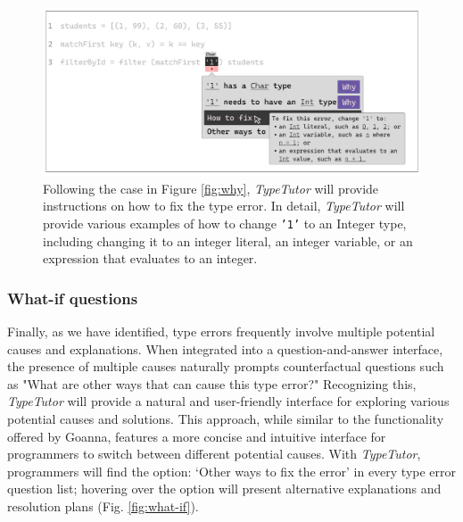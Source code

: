 \begin{figure}[hbt]
  \includegraphics[width=\linewidth]{How}
  \caption[An example of \textit{TypeTutor} providing change suggestion (`how' questions)]{
    \label{fig:how}
    Following the case in Figure \ref{fig:why}, \textit{TypeTutor} will provide instructions on how to fix the type error. In detail,  \textit{TypeTutor} will provide various examples of how to change \texttt{'1'} to an Integer type, including changing it to an integer literal, an integer variable, or an expression that evaluates to an integer.
    }
\end{figure}

\subsubsection*{What-if questions}
Finally, as we have identified, type errors frequently involve multiple potential causes and explanations. When integrated into a question-and-answer interface, the presence of multiple causes naturally prompts counterfactual questions such as "What are other ways that can cause this type error?" Recognizing this, \textit{TypeTutor} will provide a natural and user-friendly interface for exploring various potential causes and solutions. This approach, while similar to the functionality offered by Goanna, features a more concise and intuitive interface for programmers to switch between different potential causes. With \textit{TypeTutor}, programmers will find the option: `Other ways to fix the error' in every type error question list; hovering over the option will present alternative explanations and resolution plans (Fig. \ref{fig:what-if}).

